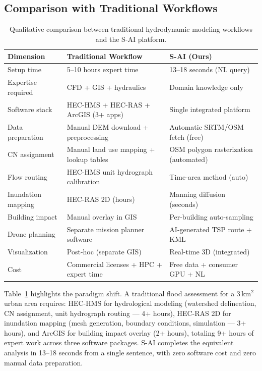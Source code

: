 \documentclass[11pt, a4paper]{article}
\begin{document}
\subsection{Comparison with Traditional Workflows}

\begin{table}[htbp]
\centering
\caption{Qualitative comparison between traditional hydrodynamic modeling workflows and the S-AI platform.}
\label{tab:workflow_comparison}
\small
\begin{tabular}{@{}p{3cm}p{4.5cm}p{4.5cm}@{}}
\toprule
\textbf{Dimension} & \textbf{Traditional Workflow} & \textbf{S-AI (Ours)} \\
\midrule
Setup time & 5--10 hours expert time & 13--18 seconds (NL query) \\
Expertise required & CFD + GIS + hydraulics & Domain knowledge only \\
Software stack & HEC-HMS + HEC-RAS + ArcGIS (3+ apps) & Single integrated platform \\
Data preparation & Manual DEM download + preprocessing & Automatic SRTM/OSM fetch (free) \\
CN assignment & Manual land use mapping + lookup tables & OSM polygon rasterization (automated) \\
Flow routing & HEC-HMS unit hydrograph calibration & Time-area method (auto) \\
Inundation mapping & HEC-RAS 2D (hours) & Manning diffusion (seconds) \\
Building impact & Manual overlay in GIS & Per-building auto-sampling \\
Drone planning & Separate mission planner software & AI-generated TSP route + KML \\
Visualization & Post-hoc (separate GIS) & Real-time 3D (integrated) \\
Cost & Commercial licenses + HPC + expert time & Free data + consumer GPU + NL \\
\bottomrule
\end{tabular}
\end{table}

Table~\ref{tab:workflow_comparison} highlights the paradigm shift. A traditional flood assessment for a 3\,km$^2$ urban area requires: HEC-HMS for hydrological modeling (watershed delineation, CN assignment, unit hydrograph routing --- 4+ hours), HEC-RAS 2D for inundation mapping (mesh generation, boundary conditions, simulation --- 3+ hours), and ArcGIS for building impact overlay (2+ hours), totaling 9+ hours of expert work across three software packages. S-AI completes the equivalent analysis in 13--18 seconds from a single sentence, with zero software cost and zero manual data preparation.
\end{document}
